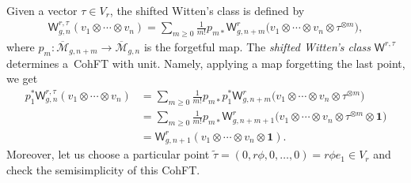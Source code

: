 \documentclass[10pt,a4paper]{amsart}
\def\oM{\overline{\mathcal{M}}}
\def\b1{{\mathbf 1}}
\def\W{\mathsf{W}}
\numberwithin{equation}{section}
\begin{document}
\begin{Example}\label{swc}
Given a vector $\tau \in V_r$, the shifted Witten's class is defined by
\begin{align*}
\W_{g,n}^{r,\tau}(v_1 \otimes \cdots \otimes v_n) =
\sum_{m \geq 0}\frac{1}{m!}
p_{m*} \W^r_{g,n+m}\big(v_1 \otimes \cdots \otimes v_n \otimes \tau^{\otimes m}\big),
\end{align*}
where $p_m \colon \oM_{g,n+m} \to \oM_{g,n}$ is the forgetful map.
The \emph{shifted Witten's class} $\W^{r,\tau}$ determines a~CohFT with unit. Namely,
applying a map forgetting the last point, we get
\begin{align*}
p^{*}_1 \W_{g,n}^{r,\tau}(v_1 \otimes \cdots \otimes v_n) &
=\sum_{m \geq 0}\frac{1}{m!}
p_{m*}p^{*}_{1} \W^r_{g,n+m}\big(v_1 \otimes \cdots \otimes v_n \otimes \tau^{\otimes m}\big)\\
&=\sum_{m \geq 0}\frac{1}{m!} p_{m*}\W^r_{g,n+m+1}\big(v_1 \otimes \cdots \otimes v_n \otimes \tau^{\otimes m}\otimes \b1\big)\\
&=\W^r_{g,n+1}(v_1 \otimes \cdots \otimes v_n \otimes \b1).
\end{align*}
Moreover, let us choose a particular point $\widetilde{\tau}=(0,r\phi,0,\dots,0)=r\phi e_1\in V_r$ and check the semisimplicity of this CohFT.


\end{Example}
\end{document}
